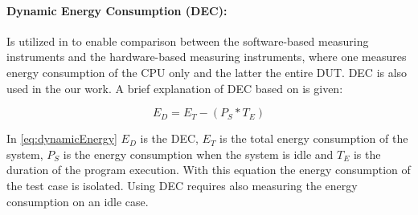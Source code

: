 \paragraph{Dynamic Energy Consumption (DEC):} Is utilized in \cite{fahad2019comparative,biksbois} to enable comparison between the software-based measuring instruments and the hardware-based measuring instruments, where one measures energy consumption of the CPU only and the latter the entire DUT. DEC is also used in the our work. A brief explanation of DEC based on \cite{fahad2019comparative} is given:

\begin{equation}\label{eq:dynamicEnergy}
    E_D = E_T - (P_S * T_E)
\end{equation}

In \cref{eq:dynamicEnergy} $E_D$ is the DEC, $E_T$ is the total energy consumption of the system, $P_S$ is the energy consumption when the system is idle and $T_E$ is the duration of the program execution. With this equation the energy consumption of the test case is isolated. Using DEC requires also measuring the energy consumption on an idle case. \cite{fahad2019comparative}
